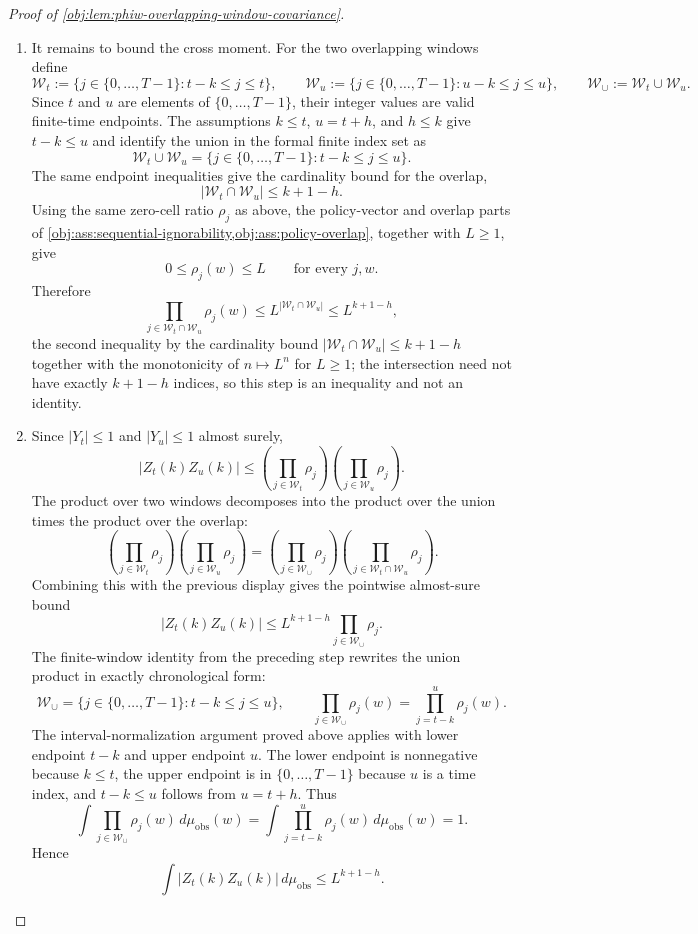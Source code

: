 \begin{proof}[Proof of \cref{obj:lem:phiw-overlapping-window-covariance}]
\begin{enumerate}
\item It remains to bound the cross moment. For the two overlapping windows define
\[
\mathcal W_t:=\{j\in\{0,\ldots,T-1\}: t-k\le j\le t\},
\qquad
\mathcal W_u:=\{j\in\{0,\ldots,T-1\}: u-k\le j\le u\},
\qquad
\mathcal W_{\cup}:=\mathcal W_t\cup\mathcal W_u .
\]
Since \(t\) and \(u\) are elements of \(\{0,\ldots,T-1\}\), their integer values are valid finite-time endpoints. The assumptions \(k\le t\), \(u=t+h\), and \(h\le k\) give \(t-k\le u\) and identify the union in the formal finite index set as
\[
\mathcal W_t\cup\mathcal W_u
=
\{j\in\{0,\ldots,T-1\}: t-k\le j\le u\}.
\]
The same endpoint inequalities give the cardinality bound for the overlap,
\[
|\mathcal W_t\cap\mathcal W_u|\le k+1-h .
\]
Using the same zero-cell ratio \(\rho_j\) as above, the policy-vector and overlap parts of \cref{obj:ass:sequential-ignorability,obj:ass:policy-overlap}, together with \(L\ge 1\), give
\[
0\le \rho_j(w)\le L
\qquad\text{for every }j,w .
\]
Therefore
\[
\prod_{j\in\mathcal W_t\cap\mathcal W_u}\rho_j(w)
\le
L^{|\mathcal W_t\cap\mathcal W_u|}
\le
L^{k+1-h},
\]
the second inequality by the cardinality bound \(|\mathcal W_t\cap\mathcal W_u|\le k+1-h\) together with the monotonicity of \(n\mapsto L^{n}\) for \(L\ge1\); the intersection need not have exactly \(k+1-h\) indices, so this step is an inequality and not an identity.

\item Since \(|Y_t|\le 1\) and \(|Y_u|\le 1\) almost surely,
\[
|Z_t(k)Z_u(k)|
\le
\left(\prod_{j\in\mathcal W_t}\rho_j\right)
\left(\prod_{j\in\mathcal W_u}\rho_j\right).
\]
The product over two windows decomposes into the product over the union times the product over the overlap:
\[
\left(\prod_{j\in\mathcal W_t}\rho_j\right)
\left(\prod_{j\in\mathcal W_u}\rho_j\right)
=
\left(\prod_{j\in\mathcal W_{\cup}}\rho_j\right)
\left(\prod_{j\in\mathcal W_t\cap\mathcal W_u}\rho_j\right).
\]
Combining this with the previous display gives the pointwise almost-sure bound
\[
|Z_t(k)Z_u(k)|
\le
L^{k+1-h}
\prod_{j\in\mathcal W_{\cup}}\rho_j .
\]
The finite-window identity from the preceding step rewrites the union product in exactly chronological form:
\[
\mathcal W_{\cup}
=
\{j\in\{0,\ldots,T-1\}: t-k\le j\le u\},
\qquad
\prod_{j\in\mathcal W_{\cup}}\rho_j(w)
=
\prod_{j=t-k}^{u}\rho_j(w).
\]
The interval-normalization argument proved above applies with lower endpoint \(t-k\) and upper endpoint \(u\). The lower endpoint is nonnegative because \(k\le t\), the upper endpoint is in \(\{0,\ldots,T-1\}\) because \(u\) is a time index, and \(t-k\le u\) follows from \(u=t+h\). Thus
\[
\int \prod_{j\in\mathcal W_{\cup}}\rho_j(w)\,d\mu_{\mathrm{obs}}(w)
=
\int \prod_{j=t-k}^{u}\rho_j(w)\,d\mu_{\mathrm{obs}}(w)
=
1 .
\]
Hence
\[
\int |Z_t(k)Z_u(k)|\,d\mu_{\mathrm{obs}}
\le
L^{k+1-h}.
\]


\end{enumerate}
\end{proof}
